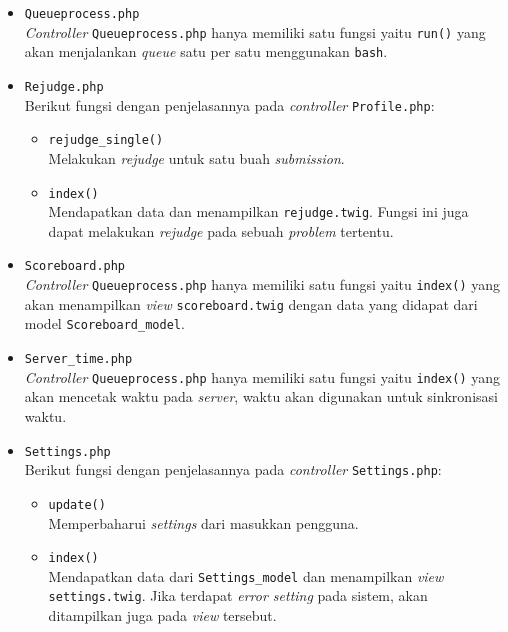 \begin{itemize}
\begin{itemize}
	\item \verb|Queueprocess.php| \\
	      \textit{Controller} \verb|Queueprocess.php| hanya memiliki satu fungsi yaitu \verb|run()| yang akan menjalankan \textit{queue} satu per satu menggunakan \verb|bash|.

	\item \verb|Rejudge.php| \\
	      Berikut fungsi dengan penjelasannya pada \textit{controller} \verb|Profile.php|:

	      \begin{itemize}
		      \item \verb|rejudge_single()| \\
		            Melakukan \textit{rejudge} untuk satu buah \textit{submission}.
		      \item \verb|index()| \\
		            Mendapatkan data dan menampilkan \verb|rejudge.twig|. Fungsi ini juga dapat melakukan \textit{rejudge} pada sebuah \textit{problem} tertentu. 
	      \end{itemize}

	\item \verb|Scoreboard.php| \\
	      \textit{Controller} \verb|Queueprocess.php| hanya memiliki satu fungsi yaitu \verb|index()| yang akan menampilkan \textit{view} \verb|scoreboard.twig| dengan data yang didapat dari model \verb|Scoreboard_model|.


	\item \verb|Server_time.php| \\
	      \textit{Controller} \verb|Queueprocess.php| hanya memiliki satu fungsi yaitu \verb|index()| yang akan mencetak waktu pada \textit{server}, waktu akan digunakan untuk sinkronisasi waktu.

	\item \verb|Settings.php| \\
	      Berikut fungsi dengan penjelasannya pada \textit{controller} \verb|Settings.php|:

	      \begin{itemize}
		      \item \verb|update()| \\
		            Memperbaharui \textit{settings} dari masukkan pengguna.
		      \item \verb|index()| \\
		            Mendapatkan data dari \verb|Settings_model| dan menampilkan \textit{view} \verb|settings.twig|. Jika terdapat \textit{error setting} pada sistem, akan ditampilkan juga pada \textit{view} tersebut. 


\end{itemize}
\end{itemize}
\end{itemize}
